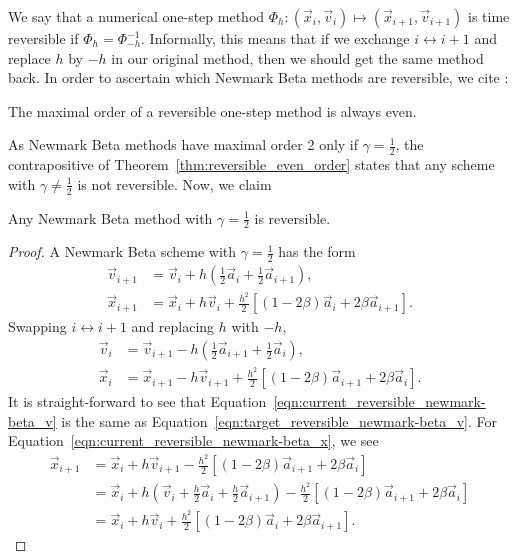 \documentclass[../Main.tex]{subfiles}
\begin{document}
We say that a numerical one-step method $\Phi_{h}: (\vec{x}_{i},\vec{v}_{i}) \mapsto (\vec{x}_{i+1},\vec{v}_{i+1})$ is time reversible if $\Phi_{h} = \Phi_{-h}^{-1}$. Informally, this means that if we exchange $i \leftrightarrow i+1$ and replace $h$ by $-h$ in our original method, then we should get the same method back.
In order to ascertain which Newmark Beta methods are reversible, we cite \cite{Paganini2017}:
\begin{theorem}The maximal order of a reversible one-step method is always even. \label{thm:reversible_even_order} \end{theorem}
 As Newmark Beta methods have maximal order 2 only if $\gamma = \frac{1}{2}$, the contrapositive of Theorem~\ref{thm:reversible_even_order} states that any scheme with $\gamma \neq \frac{1}{2}$ is not reversible. Now, we claim
\begin{claim} Any Newmark Beta method with $\gamma = \frac{1}{2}$  is reversible. \label{clm:gamma_half_reversible} \end{claim}
\begin{proof}
A Newmark Beta scheme with $\gamma = \frac{1}{2}$ has the form
\begin{align}
		\vec{v}_{i+1} & = \vec{v}_{i} + h\left(\frac{1}{2}\vec{a}_{i} + \frac{1}{2}\vec{a}_{i+1}\right), \label{eqn:target_reversible_newmark-beta_v}\\
		\vec{x}_{i+1} & = \vec{x}_{i} + h\vec{v}_{i} + \frac{h^2}{2}\left[(1-2\beta)\vec{a}_{i} + 2\beta\vec{a}_{i+1}\right].  \label{eqn:target_reversible_newmark-beta_x} 
\end{align}
Swapping $i \leftrightarrow i+1$ and replacing $h$ with $-h$,
\begin{align}
		\vec{v}_{i} & = \vec{v}_{i+1} - h\left(\frac{1}{2}\vec{a}_{i+1} + \frac{1}{2}\vec{a}_{i}\right),  \label{eqn:current_reversible_newmark-beta_v}\\
		\vec{x}_{i} & = \vec{x}_{i+1} - h\vec{v}_{i+1} + \frac{h^2}{2}\left[(1-2\beta)\vec{a}_{i+1} + 2\beta\vec{a}_{i}\right]. \label{eqn:current_reversible_newmark-beta_x} 
\end{align}
It is straight-forward to see that Equation~\ref{eqn:current_reversible_newmark-beta_v} is the same as Equation~\ref{eqn:target_reversible_newmark-beta_v}.
For Equation~\ref{eqn:current_reversible_newmark-beta_x}, we see
\begin{align*}
	\vec{x}_{i+1} & = \vec{x}_{i} + h\vec{v}_{i+1} - \frac{h^2}{2}\left[(1-2\beta)\vec{a}_{i+1} + 2\beta\vec{a}_{i}\right] \\
	& = \vec{x}_{i} + h\left(\vec{v}_{i} + \frac{h}{2}\vec{a}_{i} + \frac{h}{2}\vec{a}_{i+1}\right) - \frac{h^2}{2}\left[(1-2\beta)\vec{a}_{i+1} + 2\beta\vec{a}_{i}\right] \\
	& = \vec{x}_{i} + h\vec{v}_{i} + \frac{h^2}{2}\left[\left(1-2\beta\right)\vec{a}_{i} + 2\beta\vec{a}_{i+1}\right].
\end{align*} 
\end{proof} 
 
\end{document}
